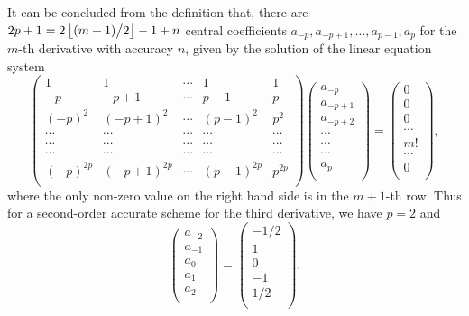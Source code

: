 \documentclass{assignment}[2019/10/15]
\newcommand{\lr}[3]{\left#1#3\right#2}
\begin{document}
    It can be concluded from the definition that, there are $2p+1 = 2\lr\lfloor\rfloor{(m+1)\middle /2}-1+n$ central coefficients $a_{-p}, a_{-p+1}, \dotsc, a_{p-1}, a_p$ for the $m$-th derivative with accuracy $n$, given by the solution of the linear equation system
    \begin{equation}
        \begin{pmatrix}
            1 & 1 & \cdots & 1 & 1\\
            -p & -p+1 & \cdots & p-1 & p\\
            (-p)^2 & (-p+1)^2 & \cdots & (p-1)^2 & p^2\\
            \cdots & \cdots & \cdots & \cdots & \cdots\\
            \cdots & \cdots & \cdots & \cdots & \cdots\\
            \cdots & \cdots & \cdots & \cdots & \cdots\\
            (-p)^{2p} & (-p+1)^{2p} & \cdots & (p-1)^{2p} & p^{2p}\\
        \end{pmatrix}
        \begin{pmatrix}
            a_{-p}\\
            a_{-p+1}\\
            a_{-p+2}\\
            \cdots\\
            \cdots\\
            \cdots\\
            a_p\\
        \end{pmatrix}
        =
        \begin{pmatrix}
            0\\
            0\\
            0\\
            \cdots\\
            m!\\
            \cdots\\
            0\\
        \end{pmatrix},
    \end{equation}
    where the only non-zero value on the right hand side is in the $m+1$-th row. Thus for a second-order accurate scheme for the third derivative, we have $p=2$ and
    \begin{equation}
        \begin{pmatrix}
            a_{-2}\\
            a_{-1}\\
            a_{0}\\
            a_1\\
            a_2\\
        \end{pmatrix}
        =
        \begin{pmatrix}
            -1/2\\
            1\\
            0\\
            -1\\
            1/2\\
        \end{pmatrix}.
    \end{equation}
\end{document}
